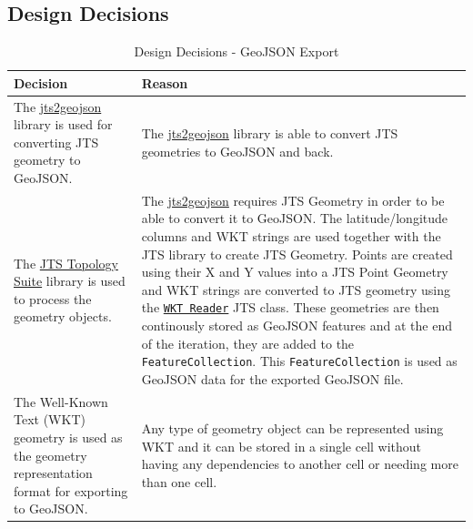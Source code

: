 \subsection{Design Decisions}
\begin{table}
    \begin{tabularx}{\textwidth}{| X | X |}
        \hline
        \textbf{Decision} & \textbf{Reason}\\[1cm]
        \hline
        The \href{https://github.com/bjornharrtell/jts2geojson}{jts2geojson} library is used for
        converting JTS geometry to GeoJSON. & The \href{https://github.com/bjornharrtell/jts2geojson}{jts2geojson} library is
        able to convert JTS geometries to GeoJSON and back. \\
        \hline
        The \href{https://github.com/locationtech/jts}{JTS Topology Suite} library is used to process the geometry objects. &
        The \href{https://github.com/bjornharrtell/jts2geojson}{jts2geojson} requires JTS Geometry in order to be able to convert it to GeoJSON.
        The latitude/longitude columns and WKT strings are used together with the JTS library to create JTS Geometry.
        Points are created using their X and Y values into a JTS Point Geometry and WKT strings are converted to JTS geometry
        using the \href{https://locationtech.github.io/jts/javadoc/org/locationtech/jts/io/WKTReader.html}{\texttt{WKT Reader}}
        JTS class. These geometries are then continously stored as GeoJSON features and at the end of the iteration,
        they are added to the \texttt{FeatureCollection}.
        This \texttt{FeatureCollection} is used as GeoJSON data for the exported GeoJSON file.\\
        \hline
        The Well-Known Text (WKT) geometry is used as the geometry representation format for exporting to GeoJSON. &
        Any type of geometry object can be represented using WKT and it can be stored in a single
        cell without having any dependencies to another cell or needing more than one cell.\\
        \hline
    \end{tabularx}
    \caption{Design Decisions - GeoJSON Export}
\end{table}
